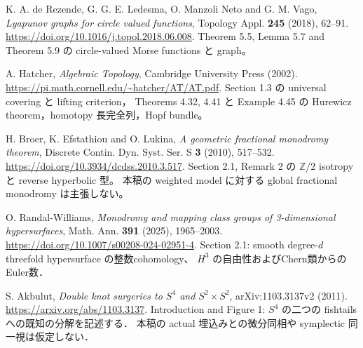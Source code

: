K. A. de Rezende, G. G. E. Ledesma, O. Manzoli Neto and G. M. Vago,
\emph{Lyapunov graphs for circle valued functions},
Topology Appl. \textbf{245} (2018), 62--91.
\url{https://doi.org/10.1016/j.topol.2018.06.008}.
Theorem 5.5, Lemma 5.7 and Theorem 5.9 の circle-valued Morse functions と graph。

A. Hatcher,
\emph{Algebraic Topology}, Cambridge University Press (2002).
\url{https://pi.math.cornell.edu/~hatcher/AT/AT.pdf}.
Section 1.3 の universal covering と lifting criterion，
Theorems 4.32, 4.41 と Example 4.45 の Hurewicz theorem，homotopy 長完全列，Hopf bundle。


H. Broer, K. Efstathiou and O. Lukina,
\emph{A geometric fractional monodromy theorem},
Discrete Contin. Dyn. Syst. Ser. S \textbf{3} (2010), 517--532.
\url{https://doi.org/10.3934/dcdss.2010.3.517}.
Section 2.1, Remark 2 の $\mathbb Z/2$ isotropy と reverse hyperbolic 型。
本稿の weighted model に対する global fractional monodromy は主張しない。


O. Randal-Williams,
\emph{Monodromy and mapping class groups of 3-dimensional hypersurfaces},
Math. Ann. \textbf{391} (2025), 1965--2003.
\url{https://doi.org/10.1007/s00208-024-02951-4}.
Section 2.1: smooth degree-$d$ threefold hypersurface の整数cohomology、
$H^3$ の自由性およびChern類からのEuler数．


S. Akbulut,
\emph{Double knot surgeries to $S^4$ and $S^2\times S^2$},
arXiv:1103.3137v2 (2011).
\url{https://arxiv.org/abs/1103.3137}.
Introduction and Figure 1: $S^4$ の二つの fishtails への既知の分解を記述する．
本稿の actual 埋込みとの微分同相や symplectic 同一視は仮定しない．
